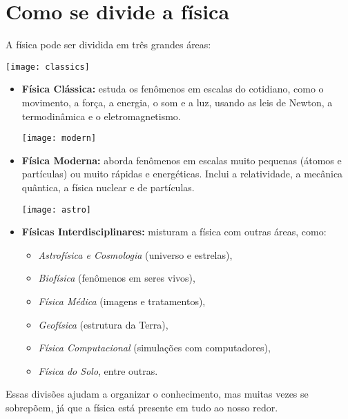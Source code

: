\documentclass[portuguese,11pt,a4paper,oneside, openany]{article}
\begin{document}
	\newpage
	\section{Como se divide a \textbf{física}}
	
	A física pode ser dividida em três grandes áreas:
	
	\begin{center}
		\texttt{[image: classics]}
	\end{center}
	
	\begin{itemize}
		\item \textbf{Física Clássica:} estuda os fenômenos em escalas do cotidiano, como o movimento, a força, a energia, o som e a luz, usando as leis de Newton, a termodinâmica e o eletromagnetismo.
		
		\begin{center}
			\texttt{[image: modern]}
		\end{center}
		
		\item \textbf{Física Moderna:} aborda fenômenos em escalas muito pequenas (átomos e partículas) ou muito rápidas e energéticas. Inclui a relatividade, a mecânica quântica, a física nuclear e de partículas.
		
		\begin{center}
			\texttt{[image: astro]}
		\end{center}
		
		\item \textbf{Físicas Interdisciplinares:} misturam a física com outras áreas, como:
		\begin{itemize}
			\item \textit{Astrofísica e Cosmologia} (universo e estrelas),
			\item \textit{Biofísica} (fenômenos em seres vivos),
			\item \textit{Física Médica} (imagens e tratamentos),
			\item \textit{Geofísica} (estrutura da Terra),
			\item \textit{Física Computacional} (simulações com computadores),
			\item \textit{Física do Solo}, entre outras.
		\end{itemize}
	\end{itemize}
	
	Essas divisões ajudam a organizar o conhecimento, mas muitas vezes se sobrepõem, já que a física está presente em tudo ao nosso redor.
	
\end{document}
